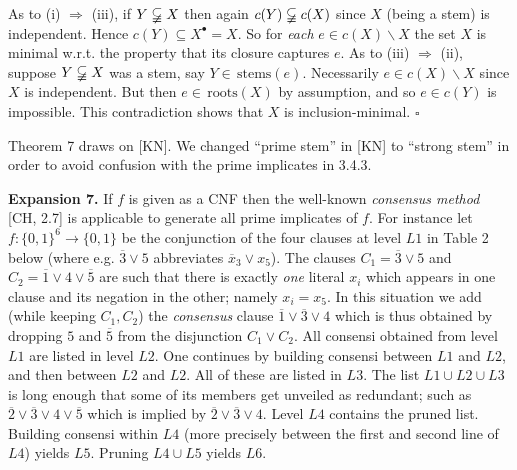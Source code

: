 \documentclass[11pt]{article}
\newcommand{\ol}{\overline}
\newcommand{\ra}{\rightarrow}
\newcommand{\Ra}{\Rightarrow}
\begin{document}
As to (i) $\Ra$ (iii), if $Y \varsubsetneqq X$ then again $c(Y) \varsubsetneqq c(X)$ since $X$ (being a stem) is independent. Hence $c(Y) \subseteq X^\bullet = X$. So for {\it each} $e \in c(X) \backslash X$ the set $X$ is minimal w.r.t. the property that its closure captures $e$. As to (iii) $\Ra$ (ii), suppose $Y \varsubsetneqq X$ was a stem, say $Y \in \, \mbox{stems}(e)$. Necessarily $e \in c(X) \backslash X$ since $X$ is independent. But then $e \in \, \mbox{roots}(X)$ by assumption, and so $e \in c(Y)$ is impossible. This contradiction shows that $X$ is inclusion-minimal. \quad $\square$

Theorem 7 draws on [KN]. We changed ``prime stem'' in [KN] to ``strong stem'' in order to avoid confusion with the prime implicates in 3.4.3. 



{\bf Expansion 7.} If $f$ is given as a CNF then the well-known {\it consensus method} [CH, 2.7] is applicable to generate all prime implicates of $f$. For instance let $f: \{0,1\}^6 \ra \{0,1\}$ be the conjunction of the four clauses at level $L1$ in Table 2 below (where e.g. $\ol{3} \vee 5$ abbreviates $\ol{x}_3 \vee x_5$). The clauses $C_1= \ol{3} \vee 5$ and $C_2 = \ol{1} \vee 4 \vee \ol{5}$ are such that there is exactly {\it one} literal $x_i$ which appears in one clause and its negation in the other; namely $x_i = x_5$. In this situation we add (while keeping $C_1, C_2$) the {\it consensus} clause $\ol{1} \vee \ol{3} \vee 4$ which is thus obtained by dropping $5$ and $\ol{5}$ from the disjunction $C_1 \vee C_2$. All consensi obtained from level $L1$ are listed in level $L2$. One continues by building consensi between $L1$ and $L2$, and then between $L2$ and $L2$. All of these are listed in $L3$. The list $L1 \cup L2 \cup L3$ is long enough that some of its members get unveiled as redundant; such as $\ol{2} \vee \ol{3} \vee 4 \vee \ol{5}$ which is implied by $\ol{2} \vee \ol{3} \vee 4$. Level $L4$ contains the pruned list. Building consensi within $L4$ (more precisely between the first and second line of $L4$) yields $L5$. Pruning $L4 \cup L5$ yields $L6$.
\end{document}
